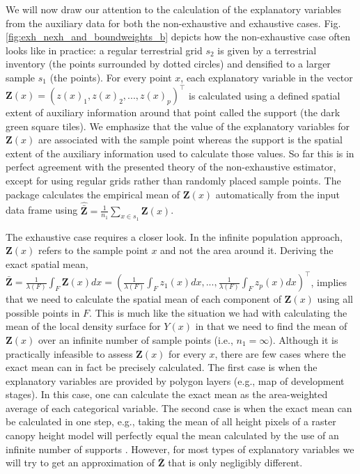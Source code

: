 We will now draw our attention to the calculation of the explanatory variables from the auxiliary data for both the non-exhaustive and exhaustive cases. Fig. \ref{fig:exh_nexh_and_boundweights_b} depicts how the non-exhaustive case often looks like in practice: a regular terrestrial grid $s_2$ is given by a terrestrial inventory (the points surrounded by dotted circles) and densified to a larger sample $s_1$ (the points). For every point $x$, each explanatory variable in the vector $\pmb{Z}(x)=(z(x)_1, z(x)_2,...,z(x)_p)^{\top}$ is calculated using a defined spatial extent of auxiliary information around that point called the support (the dark green square tiles). We emphasize that the value of the explanatory variables for $\pmb{Z}(x)$ are associated with the sample point whereas the support is the spatial extent of the auxiliary information used to calculate those values. So far this is in perfect agreement with the presented theory of the non-exhaustive estimator, except for using regular grids rather than randomly placed sample points. The  package calculates the empirical mean of $\pmb{Z}(x)$ automatically from the input data frame using $\hat{\bar{\pmb{Z}}}=\frac{1}{n_{1}}\sum_{x\in{s_{1}}}\pmb{Z}(x)$.\par

The exhaustive case requires a closer look. In the infinite population approach, $\pmb{Z}(x)$ refers to the sample point $x$ and not the area around it. Deriving the exact spatial mean, $\bar{\pmb{Z}}=\frac{1}{\lambda(F)}\int_{F} \pmb{Z}(x)dx= (\frac{1}{\lambda(F)}\int_{F} z_1(x)dx, ..., \frac{1}{\lambda(F)}\int_{F} z_p(x)dx)^{\top}$, implies that we need to calculate the spatial mean of each component of $\pmb{Z}(x)$ using all possible points in $F$. This is much like the situation we had with calculating the mean of the local density surface for $Y(x)$ in that we need to find the mean of $\pmb{Z}(x)$ over an infinite number of sample points (i.e., $n_1=\infty$). Although it is practically infeasible to assess $\pmb{Z}(x)$ for every $x$, there are few cases where the exact mean can in fact be precisely calculated. The first case is when the explanatory variables are provided by polygon layers (e.g., map of development stages). In this case, one can calculate the exact mean as the area-weighted average of each categorical variable. The second case is when the exact mean can be calculated in one step, e.g., taking the mean of all height pixels of a raster canopy height model will perfectly equal the mean calculated by the use of an infinite number of supports \citep{mandallaz2013b}. However, for most types of explanatory variables we will try to get an approximation of $\bar{\pmb{Z}}$ that is only negligibly different. \par

